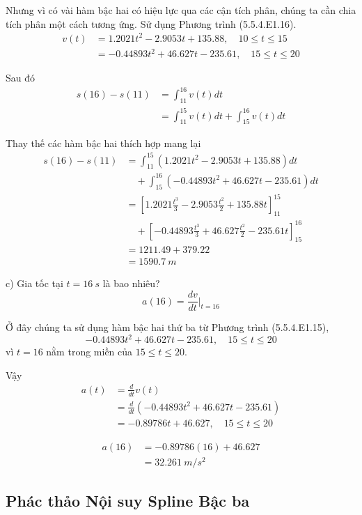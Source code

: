 Nhưng vì có vài hàm bậc hai có hiệu lực qua các cận tích phân, chúng ta cần chia tích phân một cách tương ứng. Sử dụng Phương trình (5.5.4.E1.16).
\begin{align}
v(t) &= 1.2021t^2 - 2.9053t + 135.88, \quad 10 \le t \le 15 \nonumber \\
&= -0.44893t^2 + 46.627t - 235.61, \quad 15 \le t \le 20
\end{align}

Sau đó
\begin{align}
s(16)-s(11) &= \int_{11}^{16}v(t)dt \nonumber \\
&= \int_{11}^{15}v(t)dt+\int_{15}^{16}v(t)dt
\end{align}

Thay thế các hàm bậc hai thích hợp mang lại
\begin{align}
s(16)-s(11) &= \int_{11}^{15} (1.2021t^2 - 2.9053t + 135.88) dt \nonumber \\
&\quad + \int_{15}^{16} (-0.44893t^2 + 46.627t - 235.61) dt \nonumber \\
&= \left[1.2021\frac{t^3}{3} - 2.9053\frac{t^2}{2} + 135.88t\right]_{11}^{15} \\
&\quad + \left[-0.44893\frac{t^3}{3} + 46.627\frac{t^2}{2} - 235.61t\right]_{15}^{16} \nonumber \\
&= 1211.49 + 379.22 \nonumber \\
&= 1590.7~m \nonumber
\end{align}

c) Gia tốc tại $t=16~s$ là bao nhiêu?
\begin{equation}
a(16)=\frac{dv}{dt}\bigg|_{t=16}
\end{equation}

Ở đây chúng ta sử dụng hàm bậc hai thứ ba từ Phương trình (5.5.4.E1.15),
$$ -0.44893t^{2}+46.627t-235.61, \quad 15\le t\le20 $$
vì $t=16$ nằm trong miền của $15\le t\le20$.

Vậy
\begin{align}
a(t) &= \frac{d}{dt}v(t) \nonumber \\
&= \frac{d}{dt}(-0.44893t^2 + 46.627t - 235.61) \nonumber \\
&= -0.89786t + 46.627, \quad 15 \le t \le 20
\end{align}

\begin{align}
a(16) &= -0.89786(16) + 46.627 \nonumber \\
&= 32.261~m/s^2
\end{align}


\subsection{Phác thảo Nội suy Spline Bậc ba}

